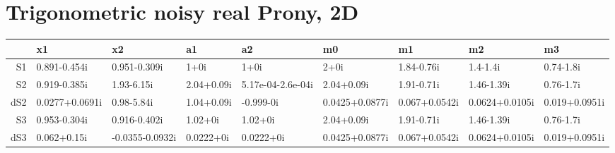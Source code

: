 \section{Trigonometric noisy real Prony, 2D}

\begin{table}
\centering
\begin{tabular}{rllllllll}
  \hline
 & x1 & x2 & a1 & a2 & m0 & m1 & m2 & m3 \\ 
  \hline
S1 & 0.891-0.454i & 0.951-0.309i & 1+0i & 1+0i & 2+0i & 1.84-0.76i & 1.4-1.4i & 0.74-1.8i \\ 
  S2 & 0.919-0.385i & 1.93-6.15i & 2.04+0.09i & 5.17e-04-2.6e-04i & 2.04+0.09i & 1.91-0.71i & 1.46-1.39i & 0.76-1.7i \\ 
  dS2 & 0.0277+0.0691i & 0.98-5.84i & 1.04+0.09i & -0.999-0i & 0.0425+0.0877i & 0.067+0.0542i & 0.0624+0.0105i & 0.019+0.0951i \\ 
   \hline
  S3 & 0.953-0.304i & 0.916-0.402i & 1.02+0i & 1.02+0i & 2.04+0.09i & 1.91-0.71i & 1.46-1.39i & 0.76-1.7i \\ 
  dS3 & 0.062+0.15i & -0.0355-0.0932i & 0.0222+0i & 0.0222+0i & 0.0425+0.0877i & 0.067+0.0542i & 0.0624+0.0105i & 0.019+0.0951i \\ 
   \hline
\end{tabular}
\end{table}
  